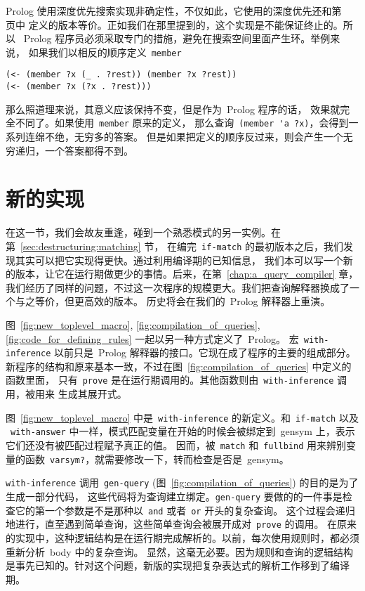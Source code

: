 Prolog 使用深度优先搜索实现非确定性，不仅如此，它使用的深度优先还和第
~\pageref{fig:scheme_implementation_of_choose_and_fail} 页中
定义的版本等价。正如我们在那里提到的，这个实现是不能保证终止的。所以
~Prolog 程序员必须采取专门的措施，避免在搜索空间里面产生环。举例来说，
如果我们以相反的顺序定义~\verb|member|
\begin{lstlisting}
(<- (member ?x (_ . ?rest)) (member ?x ?rest))
(<- (member ?x (?x . ?rest)))
\end{lstlisting}
那么照道理来说，其意义应该保持不变，但是作为~Prolog 程序的话，
效果就完全不同了。如果使用~\verb|member| 原来的定义，
那么查询~\verb|(member 'a ?x)|，会得到一系列连绵不绝，无穷多的答案。
但是如果把定义的顺序反过来，则会产生一个无穷递归，一个答案都得不到。

\section{新的实现}
\label{sec:new_implementation}

在这一节，我们会故友重逢，碰到一个熟悉模式的另一实例。在第~\ref{sec:destructuring:matching} 节，
在编完~\verb|if-match| 的最初版本之后，我们发现其实可以把它实现得更快。通过利用编译期的已知信息，
我们本可以写一个新的版本，让它在运行期做更少的事情。后来，在第~\ref{chap:a_query_compiler} 章，
我们经历了同样的问题，不过这一次程序的规模更大。我们把查询解释器换成了一个与之等价，但更高效的版本。
历史将会在我们的~Prolog 解释器上重演。

图~\ref{fig:new_toplevel_macro}, \ref{fig:compilation_of_queries}, \ref{fig:code_for_defining_rules} 一起以另一种方式定义了~Prolog。
宏~\verb|with-inference| 以前只是~Prolog 解释器的接口。它现在成了程序的主要的组成部分。
新程序的结构和原来基本一致，不过在图~\ref{fig:compilation_of_queries} 中定义的函数里面，
只有~\verb|prove| 是在运行期调用的。其他函数则由~\verb|with-inference| 调用，被用来
生成其展开式。

图~\ref{fig:new_toplevel_macro} 中是~\verb|with-inference| 的新定义。和~\verb|if-match| 以及
~\verb|with-answer| 中一样，模式匹配变量在开始的时候会被绑定到~gensym 上，表示它们还没有被匹配过程赋予真正的值。
因而，被~\verb|match| 和~\verb|fullbind| 用来辨别变量的函数~\verb|varsym?|，就需要修改一下，转而检查是否是~gensym。

\verb|with-inference| 调用~\verb|gen-query| (图~\ref{fig:compilation_of_queries}) 的目的是为了生成一部分代码，
这些代码将为查询建立绑定。\verb|gen-query| 要做的的一件事是检查它的第一个参数是不是那种以~\verb|and| 或者~\verb|or| 开头的复杂查询。
这个过程会递归地进行，直至遇到简单查询，这些简单查询会被展开成对~\verb|prove| 的调用。
在原来的实现中，这种逻辑结构是在运行期完成解析的。以前，每次使用规则时，都必须重新分析~body 中的复杂查询。
显然，这毫无必要。因为规则和查询的逻辑结构是事先已知的。针对这个问题，新版的实现把复杂表达式的解析工作移到了编译期。

